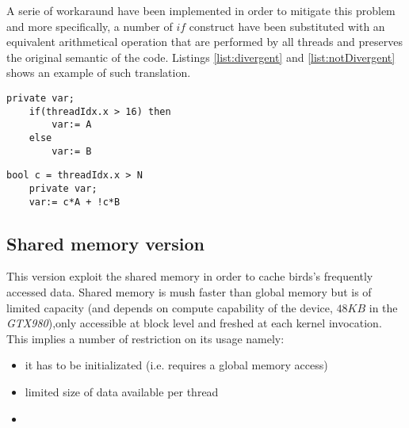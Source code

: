 A serie of workaraund have been implemented in order to mitigate this problem  and more specifically, a number of $if$ construct have been substituted with an equivalent arithmetical operation that are performed by all threads and preserves the original semantic of the code. Listings \ref{list:divergent} and \ref{list:notDivergent} shows an example of such translation.
\begin{lstlisting}[style=customc,caption=Thread Divergent code example, label={list:divergent}]
	private var;
	if(threadIdx.x > 16) then
		var:= A
	else
		var:= B
\end{lstlisting}

\begin{lstlisting}[style=customc, label={list:notDivergent}, caption=If mitigated version of the listing \ref{list:divergent} ]
	bool c = threadIdx.x > N
    private var;
	var:= c*A + !c*B
\end{lstlisting}


\subsection{Shared memory version}
This version exploit the shared memory in order to cache birds's frequently accessed data. Shared memory is mush faster than global memory but is of limited capacity (and depends on compute capability of the device, $48 KB$ in the \emph{GTX980}),only accessible at block level and freshed at each kernel invocation. This implies a number of restriction on its usage namely:

\begin{itemize}
	\item it has to be initializated (i.e. requires a global memory access)
    \item limited size of data available per thread
    \item 

\end{itemize}




































